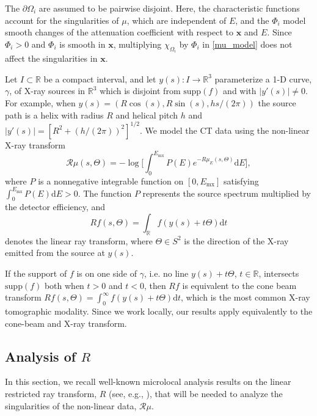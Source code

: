 \documentclass[11pt]{article}
\newcommand{\jc}[1]{\begin{quotation}\textbf{James' comment:\
}{\textit{#1}}\end{quotation}}
\newcommand{\ac}[1]{\begin{quotation}\textbf{Sasha's comment:\
}{\textit{#1}}\end{quotation}}
\newcommand{\be}{\begin{equation}}
\newcommand{\ee}{\end{equation}}
\newcommand{\br}{\mathbb{R}}
\newcommand{\ioi}{\int_0^{\infty}}
\newcommand{\dd}{\mathrm{d}}
\newcommand{\ga}{\gamma}
\numberwithin{equation}{section}
\newcommand{\vx}{\mathbf{x}}
\theoremstyle{definition}
\begin{document}

The $\partial \Omega_i$ are assumed to be pairwise disjoint. Here, the characteristic functions account for the singularities of $\mu$, which are independent of $E$, and the $\Phi_i$ model smooth changes of the attenuation coefficient with respect to $\vx$ and $E$. Since $\Phi_i > 0$ and $\Phi_i$ is smooth in $\vx$, multiplying $\chi_{\Omega_i}$ by $\Phi_i$ in \eqref{mu_model} does not affect the singularities in $\vx$. 

Let $I \subset \br$ be a compact interval, and let $y(s) : I\to \br^3$ parameterize a 1-D curve, $\gamma$, of X-ray sources in $\br^3$ which is disjoint from $\text{supp}(f)$ and with $|y'(s)| \neq 0$. For example, when $y(s) = (R\cos(s),R\sin(s), hs/(2\pi))$ the source path is a helix with radius $R$ and helical pitch $h$ and $|y'(s)| = [R^2+(h/(2\pi))^2]^{1/2}$. We model the CT data using the non-linear X-ray transform
\be\label{model_data}
\mathcal{R}\mu(s,\Theta) =-\log\Big[ \int_0^{E_{\mathrm{mx}}}P(E)e^{-R\mu_E(s,\Theta)} \mathrm{d}E\Big],
\ee
where $P$ is a nonnegative integrable function on $[0,E_{\mathrm{mx}}]$ satisfying $\int_0^{E_{\mathrm{mx}}}P(E)\dd E > 0$.  The function $P$ represents the source spectrum multiplied by the detector efficiency, and
\be
Rf(s,\Theta) = \int_{\br} f(y(s) + t\Theta) \dd t
\ee
denotes the linear ray transform, where $\Theta \in S^2$ is the direction of the X-ray emitted from the source at $y(s)$. 

If the support of $f$ is on one side of $\ga$, i.e. no line $y(s)+t\Theta$, $t\in\br$, intersects $\mathrm{supp}(f)$ both when $t>0$ and $t<0$, then $Rf$ is equivalent to the cone beam transform $Rf(s,\Theta) = \ioi f(y(s) + t\Theta) \dd t$, which is the most common X-ray tomographic modality. Since we work locally, our results apply equivalently to the cone-beam and X-ray transform.

\subsection{Analysis of $R$}
In this section, we recall well-known microlocal analysis results on the linear restricted ray transform, $R$ (see, e.g., \cite{gruhl1}), that will be needed to analyze the singularities of the non-linear data, $\mathcal{R}\mu$.
\end{document}
